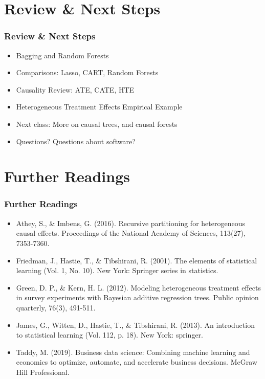 \documentclass[
  shownotes,
  xcolor={svgnames},
  hyperref={colorlinks,citecolor=DarkBlue,linkcolor=DarkRed,urlcolor=DarkBlue}
  , aspectratio=169]{beamer}
\begin{document}
\section{Review
 \& Next Steps}
\begin{frame}
\frametitle{Review \& Next Steps}
  
\begin{itemize} 
    \item Bagging and Random Forests
    \medskip
    \item  Comparisons: Lasso, CART, Random Forests
    \medskip
    \item Causality Review: ATE, CATE, HTE 
    \medskip
    \item Heterogeneous Treatment Effects Empirical Example

    \bigskip  
  \item  Next class:  More on causal trees, and causal forests


\bigskip  
\item Questions? Questions about software? 

\end{itemize}
\end{frame}
\section{Further Readings}
\begin{frame}
\frametitle{Further Readings}

\begin{itemize}

  \item Athey, S., \& Imbens, G. (2016). Recursive partitioning for heterogeneous causal effects. Proceedings of the National Academy of Sciences, 113(27), 7353-7360.
  \medskip
  \item Friedman, J., Hastie, T., \& Tibshirani, R. (2001). The elements of statistical learning (Vol. 1, No. 10). New York: Springer series in statistics.
  \medskip
  \item Green, D. P., \& Kern, H. L. (2012). Modeling heterogeneous treatment effects in survey experiments with Bayesian additive regression trees. Public opinion quarterly, 76(3), 491-511.
  \medskip
  \item James, G., Witten, D., Hastie, T., \& Tibshirani, R. (2013). An introduction to statistical learning (Vol. 112, p. 18). New York: springer.
  \medskip
  \item Taddy, M. (2019). Business data science: Combining machine learning and economics to optimize, automate, and accelerate business decisions. McGraw Hill Professional.
  

  
\end{itemize}

\end{frame}





\end{document}
